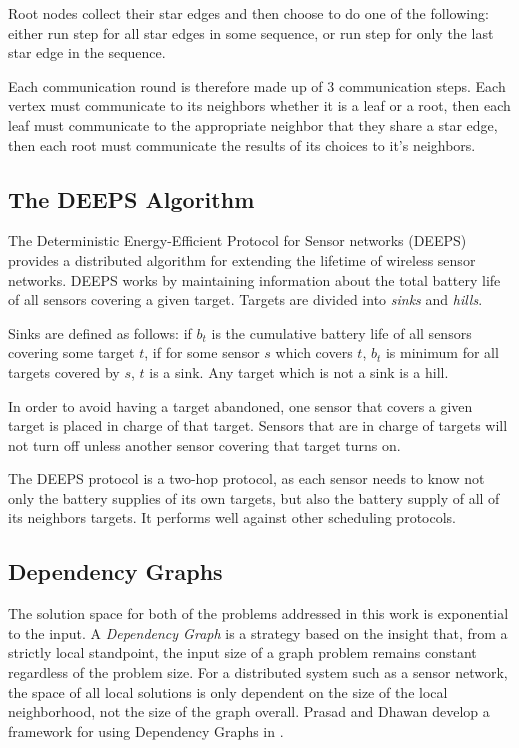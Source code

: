 \documentclass[technote, 10pt, letter]{IEEEtran}
\begin{document}
Root nodes collect their star edges and then choose to do one of the following: either run {\ttfamily step} for all star edges in some sequence, or run {\ttfamily step} for only the last star edge in the sequence. 

Each communication round is therefore made up of 3 communication steps. Each vertex must communicate to its neighbors whether it is a leaf or a root, then each leaf must communicate to the appropriate neighbor that they share a star edge, then each root must communicate the results of its choices to it's neighbors.


\subsection{The DEEPS Algorithm}
\label{sec:deeps}

The Deterministic Energy-Efficient Protocol for Sensor networks (DEEPS) provides a distributed algorithm for extending the lifetime of wireless sensor networks\cite{1640702}. DEEPS works by maintaining information about the total battery life of all sensors covering a given target. Targets are divided into {\em sinks} and {\em hills}. 

Sinks are defined as follows: if $b_t$ is the cumulative battery life of all sensors covering some target $t$, if for some sensor $s$ which covers $t$, $b_t$ is minimum for all targets covered by $s$, $t$ is a sink. Any target which is not a sink is a hill.

In order to avoid having a target abandoned, one sensor that covers a given target is placed in charge of that target. Sensors that are in charge of targets will not turn off unless another sensor covering that target turns on. 

The DEEPS protocol is a two-hop protocol, as each sensor needs to know not only the battery supplies of its own targets, but also the battery supply of all of its neighbors targets. It performs well against other scheduling protocols. 

\subsection{Dependency Graphs}
\label{sec:dep-graphs}

 The solution space for both of the problems addressed in this work is exponential to the input. A {\em Dependency Graph} is a strategy based on the insight that, from a strictly local standpoint, the input size of a graph problem remains constant regardless of the problem size. For a distributed system such as a sensor network, the space of all local solutions is only dependent on the size of the local neighborhood, not the size of the graph overall\cite{978-3-540-77220-0_36}. Prasad and Dhawan develop a framework for using Dependency Graphs in \cite{IPDPS.2008.45361}.
\end{document}
